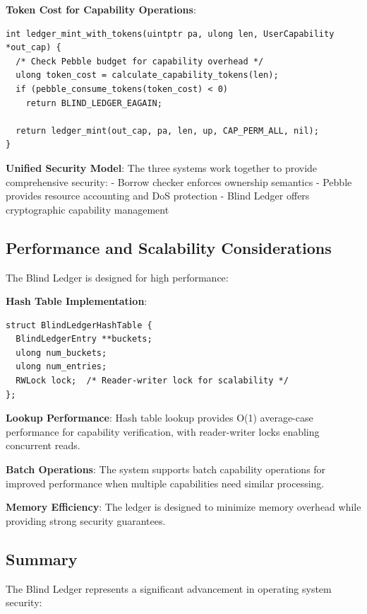 \documentclass[11pt,letterpaper]{article}
\begin{document}
\textbf{Token Cost for Capability Operations}:

\begin{lstlisting}
int ledger_mint_with_tokens(uintptr pa, ulong len, UserCapability *out_cap) {
  /* Check Pebble budget for capability overhead */
  ulong token_cost = calculate_capability_tokens(len);
  if (pebble_consume_tokens(token_cost) < 0)
    return BLIND_LEDGER_EAGAIN;
    
  return ledger_mint(out_cap, pa, len, up, CAP_PERM_ALL, nil);
}
\end{lstlisting}

\textbf{Unified Security Model}: The three systems work together to provide comprehensive security:
- Borrow checker enforces ownership semantics
- Pebble provides resource accounting and DoS protection
- Blind Ledger offers cryptographic capability management

\subsection{Performance and Scalability Considerations}

The Blind Ledger is designed for high performance:

\textbf{Hash Table Implementation}:

\begin{lstlisting}
struct BlindLedgerHashTable {
  BlindLedgerEntry **buckets;
  ulong num_buckets;
  ulong num_entries;
  RWLock lock;  /* Reader-writer lock for scalability */
};
\end{lstlisting}

\textbf{Lookup Performance}: Hash table lookup provides O(1) average-case performance for capability verification, with reader-writer locks enabling concurrent reads.

\textbf{Batch Operations}: The system supports batch capability operations for improved performance when multiple capabilities need similar processing.

\textbf{Memory Efficiency}: The ledger is designed to minimize memory overhead while providing strong security guarantees.

\subsection{Summary}

The Blind Ledger represents a significant advancement in operating system security:
\end{document}
